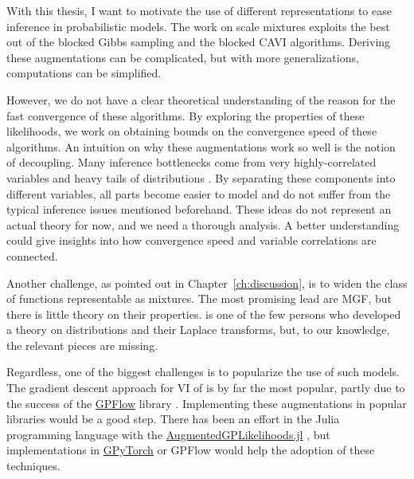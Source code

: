 

\graphicspath{{9_conclusion/figures/}}
With this thesis, I want to motivate the use of different representations to ease inference in probabilistic models.
The work on scale mixtures exploits the best out of the blocked Gibbs sampling and the blocked \ac{CAVI} algorithms.
Deriving these augmentations can be complicated, but with more generalizations, computations can be simplified.

However, we do not have a clear theoretical understanding of the reason for the fast convergence of these algorithms.
By exploring the properties of these likelihoods, we work on obtaining bounds on the convergence speed of these algorithms.
An intuition on why these augmentations work so well is the notion of decoupling.
Many inference bottlenecks come from very highly-correlated variables and heavy tails of distributions \cite{betancourt2017conceptual}.
By separating these components into different variables, all parts become easier to model and do not suffer from the typical inference issues mentioned beforehand.
These ideas do not represent an actual theory for now, and we need a thorough analysis.
A better understanding could give insights into how convergence speed and variable correlations are connected.

Another challenge, as pointed out in Chapter~\ref{ch:discussion}, is to widen the class of functions representable as mixtures.
The most promising lead are \acf{MGF}, but there is little theory on their properties.
\citet{schwartz1952transformation} is one of the few persons who developed a theory on distributions and their Laplace transforms, but, to our knowledge, the relevant pieces are missing.

Regardless, one of the biggest challenges is to popularize the use of such models.
The gradient descent approach for \ac{VI} of \citet{Hensman2015} is by far the most popular, partly due to the success of the \href{https://github.com/GPflow/GPflow}{GPFlow} library \cite{GPflow2017}.
Implementing these augmentations in popular libraries would be a good step.
There has been an effort in the Julia programming language \cite{Julia-2017} with the \href{https://github.com/JuliaGaussianProcesses/AugmentedGPLikelihoods.jl}{AugmentedGPLikelihoods.jl} \cite{theo_galy_fajou_2022_6347022}, but implementations in \href{https://gpytorch.ai/}{GPyTorch} \cite{gardner2018gpytorch} or GPFlow would help the adoption of these techniques.


